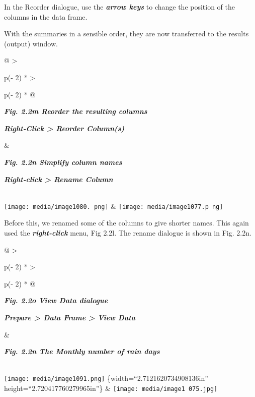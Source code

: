 \documentclass[
  letterpaper,
  DIV=11,
  numbers=noendperiod]{scrreprt}
\begin{document}
In the Reorder dialogue, use the \textbf{\emph{arrow keys}} to change
the position of the columns in the data frame.

With the summaries in a sensible order, they are now transferred to the
results (output) window.

\begin{longtable}[]{@{}
  >{\raggedright\arraybackslash}p{(\columnwidth - 2\tabcolsep) * }
  >{\raggedright\arraybackslash}p{(\columnwidth - 2\tabcolsep) * }@{}}
\toprule\noalign{}
\begin{minipage}[b]{\linewidth}\raggedright
\textbf{\emph{Fig. 2.2m Reorder the resulting columns}}

\textbf{\emph{Right-Click \textgreater{} Reorder Column(s)}}
\end{minipage} & \begin{minipage}[b]{\linewidth}\raggedright
\textbf{\emph{Fig. 2.2n Simplify column names}}

\textbf{\emph{Right-click \textgreater{} Rename Column}}
\end{minipage} \\
\midrule\noalign{}
\endhead
\bottomrule\noalign{}
\endlastfoot
\texttt{[image: media/image1080. png]}
&
\texttt{[image: media/image1077.p ng]} \\
\end{longtable}

Before this, we renamed some of the columns to give shorter names. This
again used the \textbf{\emph{right-click}} menu, Fig 2.2l. The rename
dialogue is shown in Fig. 2.2n.

\begin{longtable}[]{@{}
  >{\raggedright\arraybackslash}p{(\columnwidth - 2\tabcolsep) * }
  >{\raggedright\arraybackslash}p{(\columnwidth - 2\tabcolsep) * }@{}}
\toprule\noalign{}
\begin{minipage}[b]{\linewidth}\raggedright
\textbf{\emph{Fig. 2.2o View Data dialogue}}

\textbf{\emph{Prepare \textgreater{} Data Frame \textgreater{} View
Data}}
\end{minipage} & \begin{minipage}[b]{\linewidth}\raggedright
\textbf{\emph{Fig. 2.2n The Monthly number of rain days}}
\end{minipage} \\
\midrule\noalign{}
\endhead
\bottomrule\noalign{}
\endlastfoot
\texttt{[image: media/image1091.png]} \{width=``2.7121620734908136in''
height=``2.720417760279965in''\} &
\texttt{[image: media/image1 075.jpg]} \\
\end{longtable}
\end{document}
